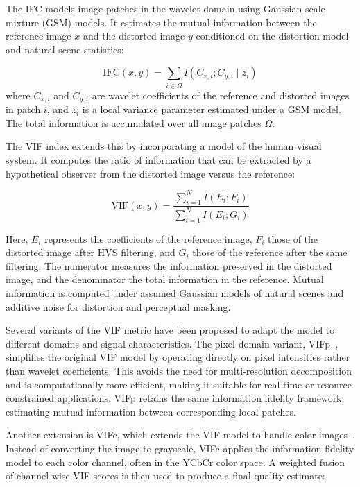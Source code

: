 The IFC models image patches in the wavelet domain using Gaussian scale mixture (GSM) models. It estimates the mutual information between the reference image $x$ and the distorted image $y$ conditioned on the distortion model and natural scene statistics:

\begin{equation}
\text{IFC}(x, y) = \sum_{i \in \Omega} I(C_{x,i}; C_{y,i} \mid z_i)
\end{equation}
where $C_{x,i}$ and $C_{y,i}$ are wavelet coefficients of the reference and distorted images in patch $i$, and $z_i$ is a local variance parameter estimated under a GSM model. The total information is accumulated over all image patches $\Omega$.

The VIF index extends this by incorporating a model of the human visual system. It computes the ratio of information that can be extracted by a hypothetical observer from the distorted image versus the reference:

\begin{equation}
\text{VIF}(x, y) = \frac{\sum_{i=1}^{N} I(E_i; F_i)}{\sum_{i=1}^{N} I(E_i; G_i)}
\end{equation}

Here, $E_i$ represents the coefficients of the reference image, $F_i$ those of the distorted image after HVS filtering, and $G_i$ those of the reference after the same filtering. The numerator measures the information preserved in the distorted image, and the denominator the total information in the reference. Mutual information is computed under assumed Gaussian models of natural scenes and additive noise for distortion and perceptual masking.

Several variants of the VIF metric have been proposed to adapt the model to different domains and signal characteristics. The pixel-domain variant, VIFp~\cite{Sheikh2005VIFp}, simplifies the original VIF model by operating directly on pixel intensities rather than wavelet coefficients. This avoids the need for multi-resolution decomposition and is computationally more efficient, making it suitable for real-time or resource-constrained applications. VIFp retains the same information fidelity framework, estimating mutual information between corresponding local patches.

Another extension is VIFc, which extends the VIF model to handle color images~\cite{Sheikh2006VIF}. Instead of converting the image to grayscale, VIFc applies the information fidelity model to each color channel, often in the YCbCr color space. A weighted fusion of channel-wise VIF scores is then used to produce a final quality estimate:

